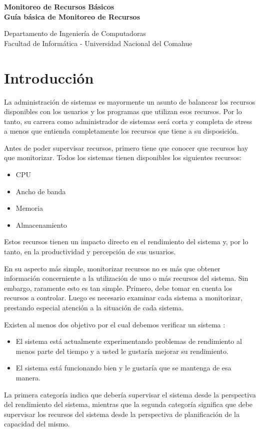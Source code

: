 \documentclass[12pt]{article}
\def\maketitle{

 \makeatletter
 {\color{bl} \centering \huge \sc \textbf{
 Monitoreo de Recursos Básicos \\ 
\large \vspace*{-8pt} \color{black} Guía básica de Monitoreo de Recursos 
 \vspace*{8pt} }\par}
 \makeatother


 \makeatletter
 {\centering \small 
 	Departamento de Ingeniería de Computadoras \\
 	Facultad de Informática - Universidad Nacional del Comahue \\
 	\vspace{20pt} }
 \makeatother

}
\begin{document}
\thispagestyle{empty}
\maketitle
\setlength{\parindent}{0pt}

\section*{Introducción}

La administración de sistemas es mayormente un asunto de balancear los recursos disponibles con 
los usuarios y los programas que utilizan esos recursos. Por lo tanto, su carrera como administrador de sistemas será corta y completa de stress a menos que entienda completamente los recursos que tiene a su disposición.

Antes de poder supervisar recursos, primero tiene que conocer que recursos hay que monitorizar.
Todos los sistemas tienen disponibles los siguientes recursos:

\begin{itemize}
\item CPU

\item Ancho de banda

\item Memoria

\item Almacenamiento
\end{itemize}

Estos recursos tienen un impacto directo en el rendimiento del sistema y, por lo tanto, en la productividad y percepción de sus usuarios.

En su aspecto más simple, monitorizar recursos no es más que obtener información concerniente a la utilización de uno o más recursos del sistema. Sin embargo, raramente esto es tan simple. Primero, debe tomar en cuenta los recursos a controlar. Luego es necesario examinar cada sistema a monitorizar, prestando especial atención a la situación de cada sistema.

Existen al menos dos objetivo por el cual debemos verificar un sistema :

\begin{itemize}
\item El sistema está actualmente experimentando problemas de rendimiento al menos parte del tiempo y a usted le gustaría mejorar su rendimiento.

\item El sistema está funcionando bien y le gustaría que se mantenga de esa manera.
\end{itemize}
La primera categoría indica que debería supervisar el sistema desde la perspectiva del rendimiento del sistema, mientras que la segunda categoría significa que debe supervisar los recursos del sistema desde la perspectiva de planificación de la capacidad del mismo.
\end{document}
